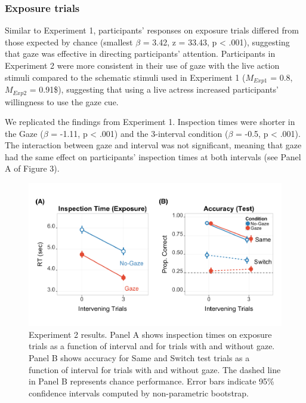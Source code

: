 \documentclass[authoryear, review]{elsarticle}
\newenvironment{CodeChunk}{}{}
\begin{document}
\subsubsection{Exposure trials}\label{exposure-trials-1}

Similar to Experiment 1, participants' responses on exposure trials
differed from those expected by chance (smallest \(\beta\) = 3.42, z =
33.43, p \textless{} .001), suggesting that gaze was effective in
directing participants' attention. Participants in Experiment 2 were
more consistent in their use of gaze with the live action stimuli
compared to the schematic stimuli used in Experiment 1 (\(M_{Exp1}\) =
0.8, \(M_{Exp2}\) = 0.91\$), suggesting that using a live actress
increased participants' willingness to use the gaze cue.

We replicated the findings from Experiment 1. Inspection times were
shorter in the Gaze (\(\beta\) = -1.11, p \textless{} .001) and the
3-interval condition (\(\beta\) = -0.5, p \textless{} .001). The
interaction between gaze and interval was not significant, meaning that
gaze had the same effect on participants' inspection times at both
intervals (see Panel A of Figure 3).

\begin{CodeChunk}
\begin{figure}[tb]

{\centering \includegraphics[width=1\linewidth]{figs/expt2-plot-1} 

}

\caption[Experiment 2 results]{Experiment 2 results. Panel A shows inspection times on exposure trials as a function of interval and for trials with and without gaze. Panel B shows accuracy for Same and Switch test trials as a function of interval for trials with and without gaze. The dashed line in Panel B represents chance performance. Error bars indicate 95\% confidence intervals computed by non-parametric bootstrap.}\label{fig:expt2-plot}
\end{figure}
\end{CodeChunk}
\end{document}
